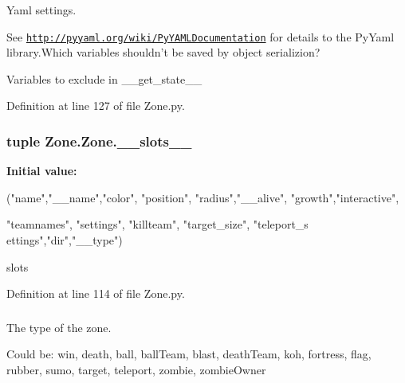 Yaml settings. 

See \href{http://pyyaml.org/wiki/PyYAMLDocumentation}{\tt http://pyyaml.org/wiki/PyYAMLDocumentation} for details to the PyYaml library.Which variables shouldn't be saved by object serializion?

Variables to exclude in \_\-\_\-get\_\-state\_\-\_\- 

Definition at line 127 of file Zone.py.

\hypertarget{class_zone_1_1_zone_ad5bde96ea6dea6f68ee68d33a6c90850}{
\subsubsection[{\_\-\_\-slots\_\-\_\-}]{\setlength{\rightskip}{0pt plus 5cm}tuple {\bf Zone.Zone.\_\-\_\-slots\_\-\_\-}}}
\label{class_zone_1_1_zone_ad5bde96ea6dea6f68ee68d33a6c90850}
{\bfseries Initial value:}
\begin{DoxyCode}
("name","__name","color", "position", "radius","__alive", "growth","interactive",
       
                  "teamnames", "settings", "killteam", "target_size", "teleport_s
      ettings","dir","__type")
\end{DoxyCode}


slots 



Definition at line 114 of file Zone.py.

\hypertarget{class_zone_1_1_zone_a5164f57edacb2b3a7b3dfca3ba949139}{
\subsubsection[{\_\-\_\-type}]{}}
\label{class_zone_1_1_zone_a5164f57edacb2b3a7b3dfca3ba949139}


The type of the zone. 

Could be: win, death, ball, ballTeam, blast, deathTeam, koh, fortress, flag, rubber, sumo, target, teleport, zombie, zombieOwner 

